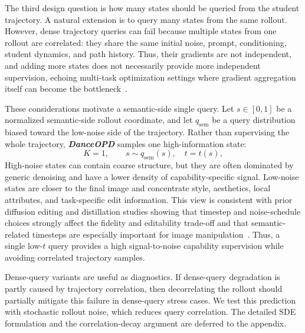 \documentclass{llmxive}
\providecommand{\name}{\textsl{\textbf{DanceOPD}}\xspace}
\begin{document}
The third design question is how many states should be queried from the student trajectory. A natural extension is to query many states from the same rollout. However, dense trajectory queries can fail because multiple states from one rollout are correlated: they share the same initial noise, prompt, conditioning, student dynamics, and path history. Thus, their gradients are not independent, and adding more states does not necessarily provide more independent supervision, echoing multi-task optimization settings where gradient aggregation itself can become the bottleneck~\cite{chen2020just,liu2021towards,navon2022multi}.

These considerations motivate a semantic-side single query. Let $s\in[0,1]$ be a normalized semantic-side rollout coordinate, and let $q_{\mathrm{sem}}$ be a query distribution biased toward the low-noise side of the trajectory. Rather than supervising the whole trajectory, \name{} samples one high-information state:
\begin{equation}
  K=1, \qquad s\sim q_{\mathrm{sem}}(s),\quad t=t(s),
  \label{eq:semantic-query}
\end{equation}
High-noise states can contain coarse structure, but they are often dominated by generic denoising and have a lower density of capability-specific signal. Low-noise states are closer to the final image and concentrate style, aesthetics, local attributes, and task-specific edit information. This view is consistent with prior diffusion editing and distillation studies showing that timestep and noise-schedule choices strongly affect the fidelity and editability trade-off and that semantic-related timesteps are especially important for image manipulation~\cite{meng2021sdedit,hertz2022prompt,wang2023not,chen2024tino,lin2024schedule}. Thus, a single low-$t$ query provides a high signal-to-noise capability supervision while avoiding correlated trajectory samples.

Dense-query variants are useful as diagnostics. If dense-query degradation is partly caused by trajectory correlation, then decorrelating the rollout should partially mitigate this failure in dense-query stress cases. We test this prediction with stochastic rollout noise, which reduces query correlation. The detailed SDE formulation and the correlation-decay argument are deferred to the appendix.
\end{document}
